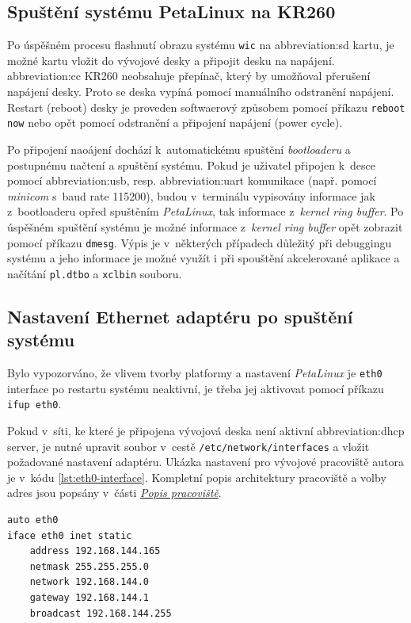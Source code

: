 \documentclass[a4paper, twoside, 11pt]{article}
\begin{document}
	\subsection{Spuštění systému PetaLinux na KR260}
		Po úspěšném procesu flashnutí obrazu systému \texttt{wic} na \gls{abbreviation:sd} kartu, je možné kartu vložit do vývojové desky a připojit desku na napájení. \gls{abbreviation:cc} KR260 neobsahuje přepínač, který by umožňoval přerušení napájení desky. Proto se deska vypíná pomocí manuálního odstranění napájení. Restart (reboot) desky je proveden softwaerový způsobem pomocí příkazu \texttt{reboot now} nebo opět pomocí odstranění a připojení napájení (power cycle).\par
		Po připojení naoájení dochází k~automatickému spuštění \textit{bootloaderu} a postupnému načtení a spuštění systému. Pokud je uživatel připojen k~desce pomocí \gls{abbreviation:usb}, resp. \gls{abbreviation:uart} komunikace (např. pomocí \textit{minicom} s~baud rate 115200), budou v~terminálu vypisovány informace jak z~bootloaderu opřed spuštěním \textit{PetaLinux}, tak informace z~\textit{kernel ring buffer}. Po úspěšném spuštění systému je možné informace z~\textit{kernel ring buffer} opět zobrazit pomocí příkazu \texttt{dmesg}. Výpis je v~některých případech důležitý při debuggingu systému a jeho informace je možné využít i při spouštění akcelerované aplikace a načítání \texttt{pl.dtbo} a \texttt{xclbin} souboru.\par

	\subsection{Nastavení Ethernet adaptéru po spuštění systému}
		Bylo vypozorváno, že vlivem tvorby platformy a nastavení \textit{PetaLinux} je \texttt{eth0} interface po restartu systému neaktivní, je třeba jej aktivovat pomocí příkazu \texttt{ifup eth0}.\par
		Pokud v~síti, ke které je připojena vývojová deska není aktivní \gls{abbreviation:dhcp} server, je nutné upravit soubor v~cestě \texttt{/etc/network/interfaces} a vložit požadované nastavení adaptéru. Ukázka nastavení pro vývojové pracoviště autora je v~kódu \ref{lst:eth0-interface}. Kompletní popis architektury pracoviště a volby adres jsou popsány v~části \hyperref[sec:popis-pracoviste]{\textit{Popis pracoviště}}.\par

\begin{lstlisting}[language={sh}, caption={Nastavení eth0 interface pro KR260 vývojovou desku na vývojovém pracovišti autora.}, label={lst:eth0-interface}, morekeywords={auto, iface, address, netmask, network, gateway, broadcast}]
auto eth0
iface eth0 inet static
	address 192.168.144.165
	netmask 255.255.255.0
	network 192.168.144.0
	gateway 192.168.144.1
	broadcast 192.168.144.255\end{lstlisting}
\end{document}
